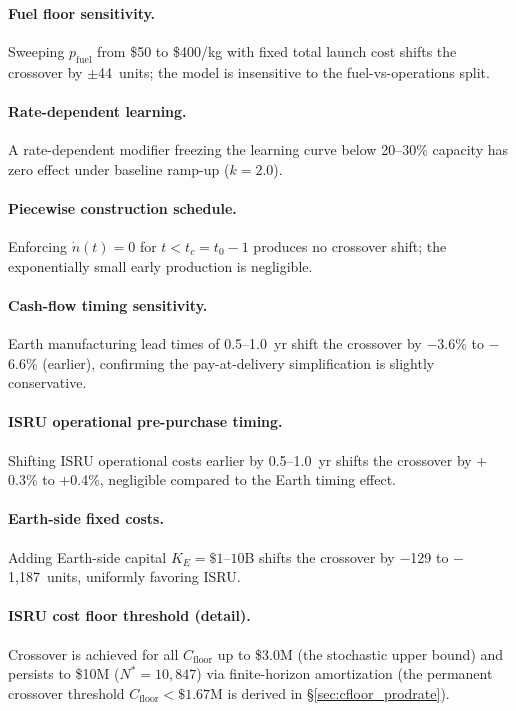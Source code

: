 \documentclass[preprint,12pt]{elsarticle}
\begin{document}
\paragraph{Fuel floor sensitivity.} Sweeping $p_{\mathrm{fuel}}$ from \$50 to \$400/kg with fixed total launch cost shifts the crossover by $\pm$44~units; the model is insensitive to the fuel-vs-operations split.

\paragraph{Rate-dependent learning.} A rate-dependent modifier freezing the learning curve below 20--30\% capacity has zero effect under baseline ramp-up ($k = 2.0$).

\paragraph{Piecewise construction schedule.} Enforcing $\dot{n}(t) = 0$ for $t < t_c = t_0 - 1$ produces no crossover shift; the exponentially small early production is negligible.

\paragraph{Cash-flow timing sensitivity.} Earth manufacturing lead times of 0.5--1.0~yr shift the crossover by $-$3.6\% to $-$6.6\% (earlier), confirming the pay-at-delivery simplification is slightly conservative.

\paragraph{ISRU operational pre-purchase timing.} Shifting ISRU operational costs earlier by 0.5--1.0~yr shifts the crossover by $+$0.3\% to $+$0.4\%, negligible compared to the Earth timing effect.

\paragraph{Earth-side fixed costs.} Adding Earth-side capital $K_E = \$1$--$10$B shifts the crossover by $-$129 to $-$1{,}187~units, uniformly favoring ISRU.

\paragraph{ISRU cost floor threshold (detail).} Crossover is achieved for all $C_{\mathrm{floor}}$ up to \$3.0M (the stochastic upper bound) and persists to \$10M ($N^* = 10{,}847$) via finite-horizon amortization (the permanent crossover threshold $C_{\mathrm{floor}} < \$1.67$M is derived in \S\ref{sec:cfloor_prodrate}).
\end{document}
